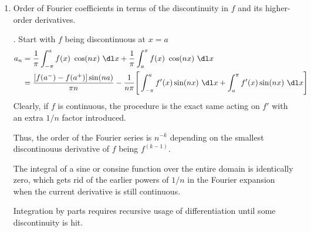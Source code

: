 \begin{enumerate}
    \item Order of Fourier coefficients in terms of the discontinuity in $ f $ and
          its higher-order derivatives. \par.
          Start with $ f $ being discontinuous at $ x = a $
          \begin{align}
              a_n & = \frac{1}{\pi} \int_{-\pi}^{a} f(x)\ \cos(nx)\ \dl x
              + \frac{1}{\pi} \int_{a}^{\pi} f(x)\ \cos(nx)\ \dl x                    \\
                  & = \frac{[f(a^-) - f(a^+)] \sin(na)}{\pi n} - \frac{1}{n\pi}\Bigg[
                  \int_{-\pi}^{a} f'(x) \sin(nx)\ \dl x  + \int_{a}^{\pi}
                  f'(x) \sin(nx)\ \dl x\Bigg]
          \end{align}
          Clearly, if $ f $ is continuous, the procedure is the exact same acting on 
          $ f' $ with an extra $ 1/n $ factor introduced. \par
          Thus, the order of the Fourier series is $ n^{-k} $ depending on the smallest
          discontinouus derivative of $ f $ being $ f^{(k-1)} $. \par
          The integral of a sine or consine function over the entire domain is
          identically zero, which gets rid of the earlier powers of $ 1/n $ in the 
          Fourier expansion when the current derivative is still continuous. \par
          Integration by parts requires recursive usage of differentiation until 
          some discontinuity is hit.
\end{enumerate}